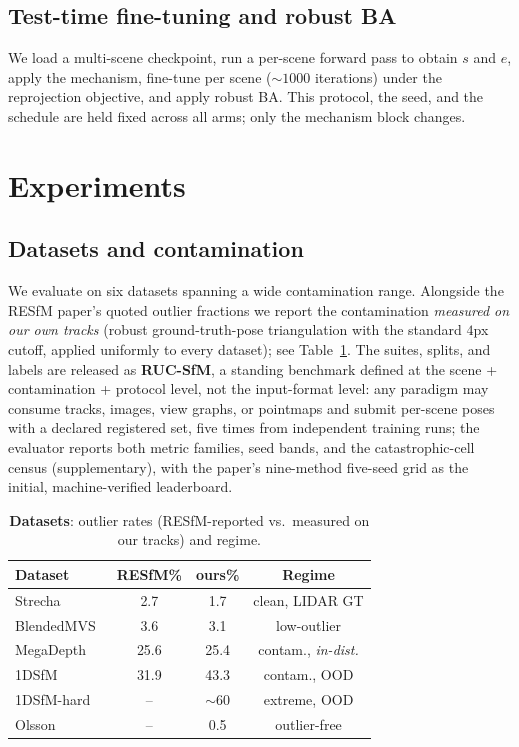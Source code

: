 \documentclass[10pt,twocolumn,letterpaper]{article}
\begin{document}
\subsection{Test-time fine-tuning and robust BA}
We load a multi-scene checkpoint, run a per-scene forward pass to obtain $s$ and $e$, apply
the mechanism, fine-tune per scene ($\sim\!1000$ iterations) under the reprojection
objective, and apply robust BA. This protocol, the seed, and the schedule are held fixed
across all arms; only the mechanism block changes.

\section{Experiments}
\subsection{Datasets and contamination}
We evaluate on six datasets spanning a wide contamination range. Alongside the RESfM
paper's quoted outlier fractions we report the contamination \emph{measured on our own
tracks} (robust ground-truth-pose triangulation with the standard $4$px cutoff, applied
uniformly to every dataset); see Table~\ref{tab:datasets}. The suites, splits, and
labels are released as \textbf{RUC-SfM}, a standing benchmark defined at the scene +
contamination + protocol level, not the input-format level: any paradigm may consume
tracks, images, view graphs, or pointmaps and submit per-scene poses with a declared
registered set, five times from independent training runs; the evaluator reports both
metric families, seed bands, and the catastrophic-cell census (supplementary), with
the paper's nine-method five-seed grid as the initial, machine-verified leaderboard.
\begin{table}[t]\centering\footnotesize
\caption{\textbf{Datasets}: outlier rates (RESfM-reported vs.\ measured on our tracks) and regime.}
\label{tab:datasets}
\setlength{\tabcolsep}{1.2pt}%
\begin{tabular}{lccc}
\toprule
Dataset & RESfM\% & ours\% & Regime\\
\midrule
Strecha~\citep{strecha} & 2.7 & 1.7 & clean, LIDAR GT\\
BlendedMVS~\citep{blendedmvs} & 3.6 & 3.1 & low-outlier\\
MegaDepth~\citep{megadepth} & 25.6 & 25.4 & contam., \emph{in-dist.}\\
1DSfM~\citep{onedsfm} & 31.9 & 43.3 & contam., OOD\\
1DSfM-hard & -- & $\sim$60 & extreme, OOD\\
Olsson~\citep{olsson} & -- & 0.5 & outlier-free\\
\bottomrule
\end{tabular}
\end{table}
\end{document}

